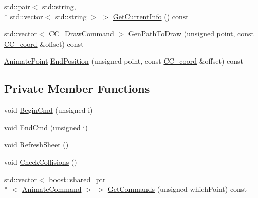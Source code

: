 \begin{DoxyCompactItemize}
\item 
std\-::pair$<$ std\-::string, \\*
std\-::vector$<$ std\-::string $>$ $>$ \hyperlink{a00010_a6b082a6468594117eb0c67e711df6c90}{Get\-Current\-Info} () const 
\item 
std\-::vector$<$ \hyperlink{a00031}{C\-C\-\_\-\-Draw\-Command} $>$ \hyperlink{a00010_a21fbf6114ee962ac7f4b55dbcd048955}{Gen\-Path\-To\-Draw} (unsigned point, const \hyperlink{a00029}{C\-C\-\_\-coord} \&offset) const 
\item 
\hyperlink{a00196_a91212e6bb797b2b440819b6a9a86f702}{Animate\-Point} \hyperlink{a00010_a6d49cd0a8acd0996a71880a207cc3c79}{End\-Position} (unsigned point, const \hyperlink{a00029}{C\-C\-\_\-coord} \&offset) const 
\end{DoxyCompactItemize}
\subsection*{Private Member Functions}
\begin{DoxyCompactItemize}
\item 
void \hyperlink{a00010_aaa42809ed2f413a88a931e1bbc9f0022}{Begin\-Cmd} (unsigned i)
\item 
void \hyperlink{a00010_a9206b83afe0f3d9af32fa5c5ed3ff891}{End\-Cmd} (unsigned i)
\item 
void \hyperlink{a00010_ace07eadd483794e6b565b4f0edffa1e8}{Refresh\-Sheet} ()
\item 
void \hyperlink{a00010_a72a444e343b278a04baff74ab204243e}{Check\-Collisions} ()
\item 
std\-::vector$<$ boost\-::shared\-\_\-ptr\\*
$<$ \hyperlink{a00003}{Animate\-Command} $>$ $>$ \hyperlink{a00010_ada367c468f7e09499c9f9e9369b11a1e}{Get\-Commands} (unsigned which\-Point) const 
\end{DoxyCompactItemize}
